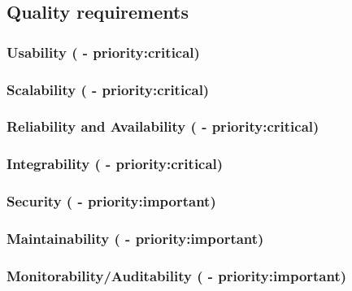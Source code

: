 \documentclass[a4paper,12pt,titlepage]{article}
\begin{document}
	\newpage			
 	\subsection{Quality requirements} 	
		\subsubsection{Usability ( - priority:critical)} \label{sec:usability}
			
			
		\subsubsection{Scalability ( - priority:critical)} \label{sec:scalability}
			
			
		\subsubsection{Reliability and Availability ( - priority:critical)} \label{sec:reliabilityavailability}
			
			
		\subsubsection{Integrability ( - priority:critical)} \label{sec:integrability}
			
		
		\subsubsection{Security ( - priority:important)} \label{sec:security}
					
		
		\subsubsection{Maintainability ( - priority:important)} \label{sec:maintainability}
			
			
		\subsubsection{Monitorability/Auditability ( - priority:important)} \label{sec:auditability}
			
			
\end{document}
